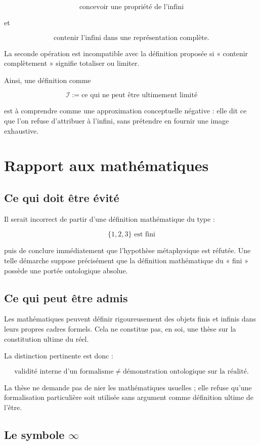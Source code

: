 \documentclass[11pt,a4paper]{article}
\newcommand{\Inf}{\mathcal I}
\begin{document}
\[
\text{concevoir une propriété de l'infini}
\]

et

\[
\text{contenir l'infini dans une représentation complète}.
\]

La seconde opération est incompatible avec la définition proposée si « contenir complètement » signifie totaliser ou limiter.

Ainsi, une définition comme

\[
\Inf := \text{ce qui ne peut être ultimement limité}
\]

est à comprendre comme une approximation conceptuelle négative : elle dit ce que l'on refuse d'attribuer à l'infini, sans prétendre en fournir une image exhaustive.

\section{Rapport aux mathématiques}

\subsection{Ce qui doit être évité}

Il serait incorrect de partir d'une définition mathématique du type :

\[
\{1,2,3\} \text{ est fini}
\]

puis de conclure immédiatement que l'hypothèse métaphysique est réfutée. Une telle démarche suppose précisément que la définition mathématique du « fini » possède une portée ontologique absolue.

\subsection{Ce qui peut être admis}

Les mathématiques peuvent définir rigoureusement des objets finis et infinis dans leurs propres cadres formels. Cela ne constitue pas, en soi, une thèse sur la constitution ultime du réel.

La distinction pertinente est donc :

\[
\boxed{
\text{validité interne d'un formalisme} \neq \text{démonstration ontologique sur la réalité}.
}
\]

La thèse ne demande pas de nier les mathématiques usuelles ; elle refuse qu'une formalisation particulière soit utilisée sans argument comme définition ultime de l'être.

\subsection{Le symbole \texorpdfstring{$\infty$}{infty}}
\end{document}
